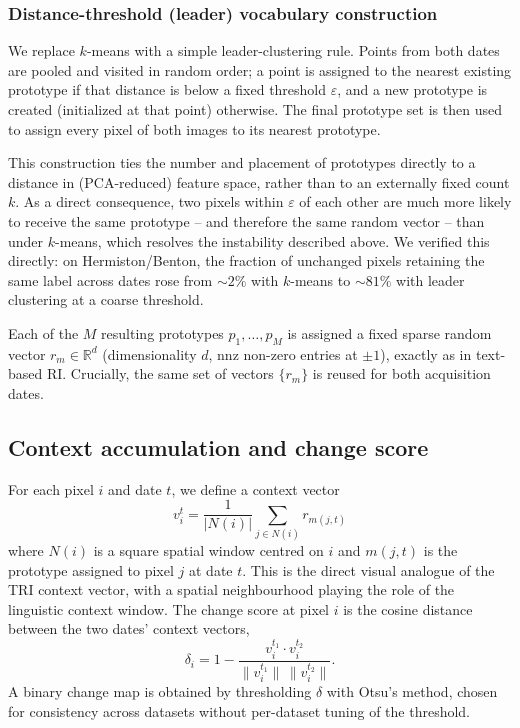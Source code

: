 \documentclass[11pt]{article}
\begin{document}
\subsubsection{Distance-threshold (leader) vocabulary construction}
\label{sec:leader}

We replace $k$-means with a simple leader-clustering rule. Points from both dates are pooled and visited in random order; a point is assigned to the nearest existing prototype if that distance is below a fixed threshold $\varepsilon$, and a new prototype is created (initialized at that point) otherwise. The final prototype set is then used to assign every pixel of both images to its nearest prototype.

This construction ties the number and placement of prototypes directly to a distance in (PCA-reduced) feature space, rather than to an externally fixed count $k$. As a direct consequence, two pixels within $\varepsilon$ of each other are much more likely to receive the same prototype -- and therefore the same random vector -- than under $k$-means, which resolves the instability described above. We verified this directly: on Hermiston/Benton, the fraction of unchanged pixels retaining the same label across dates rose from $\sim\!2\%$ with $k$-means to $\sim\!81\%$ with leader clustering at a coarse threshold.

Each of the $M$ resulting prototypes $p_1, \dots, p_M$ is assigned a fixed sparse random vector $r_m \in \mathbb{R}^d$ (dimensionality $d$, $\mathrm{nnz}$ non-zero entries at $\pm 1$), exactly as in text-based RI. Crucially, the same set of vectors $\{r_m\}$ is reused for both acquisition dates.

\subsection{Context accumulation and change score}

For each pixel $i$ and date $t$, we define a context vector
\[
v_i^{t} = \frac{1}{|N(i)|}\sum_{j \in N(i)} r_{m(j,t)}
\]
where $N(i)$ is a square spatial window centred on $i$ and $m(j,t)$ is the prototype assigned to pixel $j$ at date $t$. This is the direct visual analogue of the TRI context vector, with a spatial neighbourhood playing the role of the linguistic context window. The change score at pixel $i$ is the cosine distance between the two dates' context vectors,
\[
\delta_i = 1 - \frac{v_i^{t_1} \cdot v_i^{t_2}}{\lVert v_i^{t_1} \rVert \, \lVert v_i^{t_2} \rVert}.
\]
A binary change map is obtained by thresholding $\delta$ with Otsu's method, chosen for consistency across datasets without per-dataset tuning of the threshold.
\end{document}
